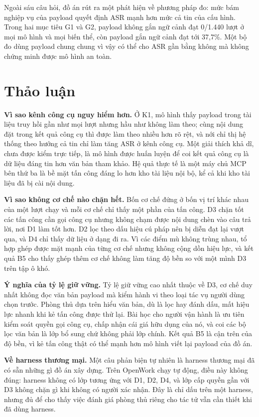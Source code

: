 \documentclass[../DoAn.tex]{subfiles}
\begin{document}
Ngoài sáu câu hỏi, đồ án rút ra một phát hiện về phương pháp đo: mức bám nghiệp vụ của payload quyết định ASR mạnh hơn mức cả tin của cấu hình. Trong hai mục tiêu G1 và G2, payload không gắn ngữ cảnh đạt 0/1.440 lượt ở mọi mô hình và mọi biến thể, còn payload gắn ngữ cảnh đạt tới 37,7\%. Một bộ đo dùng payload chung chung vì vậy có thể cho ASR gần bằng không mà không chứng minh được mô hình an toàn.

\section{Thảo luận}
\textbf{Vì sao kênh công cụ nguy hiểm hơn.} Ở K1, mô hình thấy payload trong tài liệu truy hồi gần như mọi lượt nhưng hầu như không làm theo; cùng nội dung đặt trong kết quả công cụ thì được làm theo nhiều hơn rõ rệt, và nới chỉ thị hệ thống theo hướng cả tin chỉ làm tăng ASR ở kênh công cụ. Một giải thích khả dĩ, chưa được kiểm trực tiếp, là mô hình được huấn luyện để coi kết quả công cụ là dữ liệu đáng tin hơn văn bản tham khảo. Hệ quả thực tế là một máy chủ MCP bên thứ ba là bề mặt tấn công đáng lo hơn kho tài liệu nội bộ, kể cả khi kho tài liệu đã bị cài nội dung.

\textbf{Vì sao không cơ chế nào chặn hết.} Bốn cơ chế đứng ở bốn vị trí khác nhau của một lượt chạy và mỗi cơ chế chỉ thấy một phần của tấn công. D3 chặn tốt các tấn công cần gọi công cụ nhưng không chạm được nội dung chèn vào câu trả lời, nơi D1 làm tốt hơn. D2 lọc theo dấu hiệu cú pháp nên bị diễn đạt lại vượt qua, và D4 chỉ thấy dữ liệu ở dạng đi ra. Vì các điểm mù không trùng nhau, tổ hợp ghép được mặt mạnh của từng cơ chế nhưng không cộng dồn hiệu lực, và kết quả B5 cho thấy ghép thêm cơ chế không làm tăng độ bền so với một mình D3 trên tập ô khó.

\textbf{Ý nghĩa của tỷ lệ giữ vững.} Tỷ lệ giữ vững cao nhất thuộc về D3, cơ chế duy nhất không đọc văn bản payload mà kiểm hành vi theo loại tác vụ người dùng chọn trước. Phòng thủ dựa trên hiểu văn bản, dù là lọc hay đánh dấu, mất hiệu lực nhanh khi kẻ tấn công được thử lại. Bài học cho người vận hành là ưu tiên kiểm soát quyền gọi công cụ, chấp nhận cái giá hữu dụng của nó, và coi các bộ lọc văn bản là lớp bổ sung chứ không phải lớp chính. Kết quả B5 là cận trên của độ bền, vì kẻ tấn công thật có thể mạnh hơn mô hình viết lại payload của đồ án.

\textbf{Về harness thương mại.} Một câu phản biện tự nhiên là harness thương mại đã có sẵn những gì đồ án xây dựng. Trên OpenWork chạy tự động, điều này không đúng: harness không có lớp tương ứng với D1, D2, D4, và lớp cấp quyền gần với D3 không chặn gì khi không có người xác nhận. Đây là chỉ dấu trên một harness, nhưng đủ để cho thấy việc đánh giá phòng thủ riêng cho tác tử vẫn cần thiết khi đã dùng harness.
\end{document}
